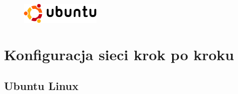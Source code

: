 \documentclass[a4paper,12pt]{scrartcl}
\begin{document}
\newpage
\enlargethispage{20pt}

\begin{figure}[t!]
    \raggedleft
    \vspace{-20pt}
    \includegraphics[height=1cm,keepaspectratio]{Bilder/Ubuntu_logo}
    \vspace{-20pt}
\end{figure}

\section*{Konfiguracja sieci krok po kroku}
\subsection*{Ubuntu Linux}
\end{document}
